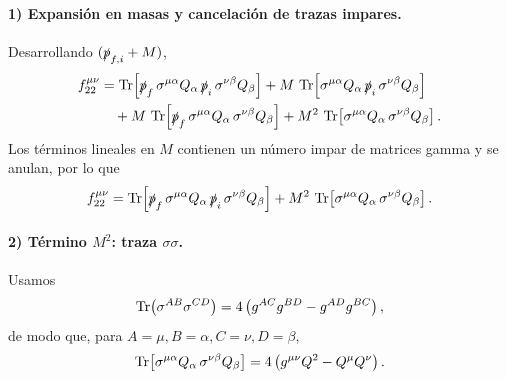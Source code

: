 \paragraph{1) Expansión en masas y cancelación de trazas impares.}
Desarrollando \((\slashed p_{f,i}+M)\),
\begin{align}
f_{22}^{\mu\nu}
&=
\Tr\!\left[\slashed{p}_f\,\sigma^{\mu\alpha}Q_\alpha\,\slashed{p}_i\,\sigma^{\nu\beta}Q_\beta\right]
+M\,\Tr\!\left[\sigma^{\mu\alpha}Q_\alpha\,\slashed{p}_i\,\sigma^{\nu\beta}Q_\beta\right]
\nonumber\\
&\quad
+M\,\Tr\!\left[\slashed{p}_f\,\sigma^{\mu\alpha}Q_\alpha\,\sigma^{\nu\beta}Q_\beta\right]
+M^2\,\Tr\!\left[\sigma^{\mu\alpha}Q_\alpha\,\sigma^{\nu\beta}Q_\beta\right].
\end{align}
Los términos lineales en \(M\) contienen un número impar de matrices gamma y se anulan, por lo que
\begin{equation}
f_{22}^{\mu\nu}
=
\Tr\!\left[\slashed{p}_f\,\sigma^{\mu\alpha}Q_\alpha\,\slashed{p}_i\,\sigma^{\nu\beta}Q_\beta\right]
+M^2\,\Tr\!\left[\sigma^{\mu\alpha}Q_\alpha\,\sigma^{\nu\beta}Q_\beta\right].
\label{eq:f22_reduced_mass}
\end{equation}

\paragraph{2) Término $M^2$: traza $\sigma\sigma$.}
Usamos
\begin{equation}
\Tr\!\left(\sigma^{AB}\sigma^{CD}\right)=4\left(g^{AC}g^{BD}-g^{AD}g^{BC}\right),
\end{equation}
de modo que, para \(A=\mu,B=\alpha,C=\nu,D=\beta\),
\begin{equation}
\Tr\!\left[\sigma^{\mu\alpha}Q_\alpha\,\sigma^{\nu\beta}Q_\beta\right]
=
4\left(g^{\mu\nu}Q^2-Q^\mu Q^\nu\right).
\label{eq:sigmasigma_contracted}
\end{equation}

